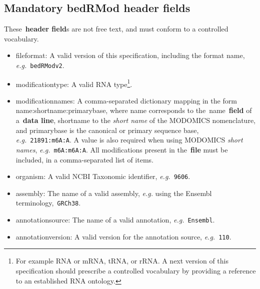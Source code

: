 \documentclass[11pt]{article}
\begin{document}
\subsection{Mandatory \acs{bedRMod} header fields}\label{sec:recommend-header}
These~\textbf{header field}s are not free text, and must conform to a controlled vocabulary.
\begin{itemize}
\item \textsf{fileformat}: A valid version of this specification, including the format name, \textit{e.g.}~\texttt{bedRModv2}. 

\item \textsf{modification\textunderscore type}: A valid RNA type\footnote{For example RNA or mRNA, tRNA, or rRNA. A next version of this specification should prescribe a controlled vocabulary by providing a reference to an established RNA ontology.}.

\item \textsf{modification\textunderscore names}: A comma-separated dictionary mapping in the form name:short\textunderscore name:primary\textunderscore base, where name corresponds to the~\textsf{name}~\textbf{field} of a~\textbf{data line}, short\textunderscore name to the \emph{short name} of the MODOMICS nomenclature, and primary\textunderscore base is the canonical or primary sequence base, \textit{e.g.}~\texttt{21891:m6A:A}. A value is also required when using MODOMICS \emph{short names}, \textit{e.g.}~\texttt{m6A:m6A:A}. All modifications present in the~\textbf{file} must be included, in a comma-separated list of items.

\item \textsf{organism}: A valid NCBI Taxonomic identifier, \textit{e.g.}~\texttt{9606}.

\item \textsf{assembly}: The name of a valid assembly, \textit{e.g.} using the Ensembl terminology,~\texttt{GRCh38}. 

\item \textsf{annotation\textunderscore source}: The name of a valid annotation, \textit{e.g.}~\texttt{Ensembl}. 

\item \textsf{annotation\textunderscore version}: A valid version for the annotation source, \textit{e.g.}~\texttt{110}. 
\end{itemize}
\end{document}
